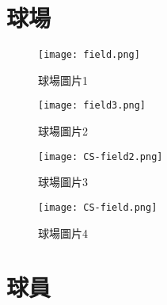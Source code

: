 \section{球場}

\begin{figure}
  \centering
  \texttt{[image: field.png]}
  \caption{球場圖片1}
  \label{fig:example}
\end{figure}


\begin{figure}
  \centering
  \texttt{[image: field3.png]}
  \caption{球場圖片2}
  \label{fig:example}
\end{figure}


\begin{figure}
  \centering
  \texttt{[image: CS-field2.png]}
  \caption{球場圖片3}
  \label{fig:example}
\end{figure}


\begin{figure}
  \centering
  \texttt{[image: CS-field.png]}
  \caption{球場圖片4}
  \label{fig:example}
\end{figure}
\section{球員}